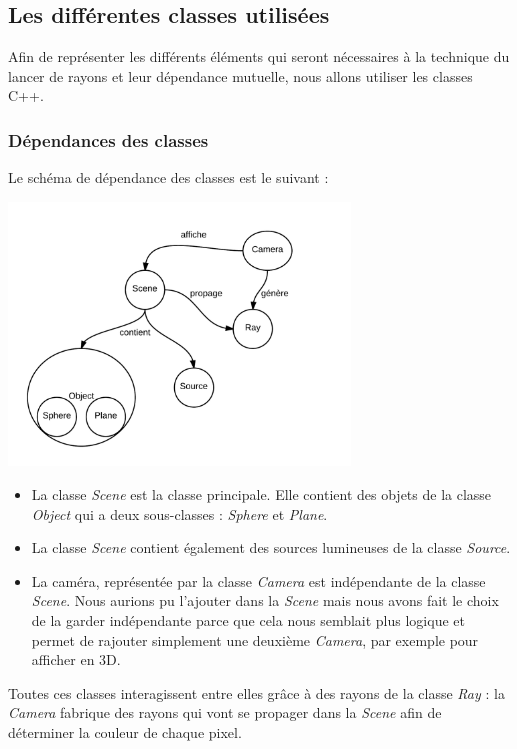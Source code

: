 \documentclass{article}
\begin{document}
		\subsection{Les différentes classes utilisées}

Afin de représenter les différents éléments qui seront nécessaires à la technique du lancer de rayons et leur dépendance mutuelle, nous allons utiliser les classes C++.

\subsubsection{Dépendances des classes}
Le schéma de dépendance des classes est le suivant :
	\begin{center}
    		\includegraphics[height = 7cm]{schema.png}
  		\end{center}

	\begin{itemize}
\item La classe \emph{Scene} est la classe principale. Elle contient des objets de la classe \emph{Object} qui a deux sous-classes : \emph{Sphere} et \emph{Plane}. 
\item La classe \emph{Scene} contient également des sources lumineuses de la classe \emph{Source}.
\item La caméra, représentée par la classe \emph{Camera} est indépendante de la classe \emph{Scene}. Nous aurions pu l'ajouter dans la \emph{Scene} mais nous avons fait le choix de la garder ind\'ependante parce que cela nous semblait plus logique et permet de rajouter simplement une deuxi\`eme \emph{Camera}, par exemple pour afficher en 3D.

\end{itemize}
Toutes ces classes interagissent entre elles grâce à des rayons de la classe \emph{Ray} : la \emph{Camera} fabrique des rayons qui vont se propager dans la \emph{Scene} afin de d\'eterminer la couleur de chaque pixel.
\end{document}
